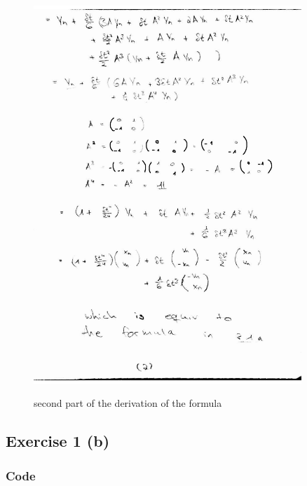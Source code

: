 \documentclass[12pt,a4paper]{article}	%
\begin{document}
\begin{figure}[h!]		
\centering
{\includegraphics[width=0.9\textwidth]{3_1_a2.jpg}}		
\caption{second part of the derivation of the formula}
\end{figure}

\newpage



\subsection{Exercise 1 (b)}
\subsubsection{Code}

%
\newpage
\end{document}
